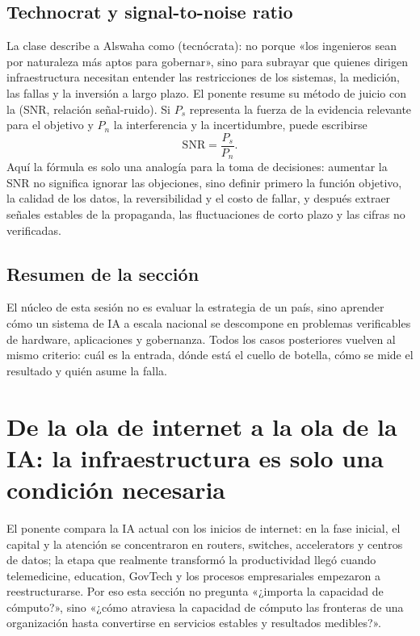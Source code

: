 \documentclass[a4paper]{article}
\begin{document}
\subsection{Technocrat y signal-to-noise ratio}

La clase describe a Alswaha como  (tecnócrata): no porque «los ingenieros sean por naturaleza más aptos para gobernar», sino para subrayar que quienes dirigen infraestructura necesitan entender las restricciones de los sistemas, la medición, las fallas y la inversión a largo plazo. El ponente resume su método de juicio con la  (SNR, relación señal-ruido). Si $P_s$ representa la fuerza de la evidencia relevante para el objetivo y $P_n$ la interferencia y la incertidumbre, puede escribirse
\[
\mathrm{SNR}=\frac{P_s}{P_n}.
\]
Aquí la fórmula es solo una analogía para la toma de decisiones: aumentar la SNR no significa ignorar las objeciones, sino definir primero la función objetivo, la calidad de los datos, la reversibilidad y el costo de fallar, y después extraer señales estables de la propaganda, las fluctuaciones de corto plazo y las cifras no verificadas.


\subsection{Resumen de la sección}

El núcleo de esta sesión no es evaluar la estrategia de un país, sino aprender cómo un sistema de IA a escala nacional se descompone en problemas verificables de hardware, aplicaciones y gobernanza. Todos los casos posteriores vuelven al mismo criterio: cuál es la entrada, dónde está el cuello de botella, cómo se mide el resultado y quién asume la falla.
\section{De la ola de internet a la ola de la IA: la infraestructura es solo una condición necesaria}

El ponente compara la IA actual con los inicios de internet: en la fase inicial, el capital y la atención se concentraron en routers, switches, accelerators y centros de datos; la etapa que realmente transformó la productividad llegó cuando telemedicine, education, GovTech y los procesos empresariales empezaron a reestructurarse. Por eso esta sección no pregunta «¿importa la capacidad de cómputo?», sino «¿cómo atraviesa la capacidad de cómputo las fronteras de una organización hasta convertirse en servicios estables y resultados medibles?».
\end{document}
